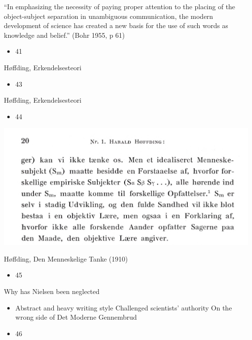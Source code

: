 \documentclass{beamer}
\begin{document}
\begin{frame}{“In emphasizing the necessity of paying proper attention to the placing of the object-subject separation in unambiguous communication, the modern development of science has created a new basis for the use of such words as knowledge and belief.” (Bohr 1955, p 61)}
\begin{itemize}
  \item 41
\end{itemize}
\end{frame}
\begin{frame}{42}
\end{frame}
\begin{frame}{Høffding, Erkendelsesteori}
\begin{itemize}
  \item 43
\end{itemize}
\end{frame}
\begin{frame}{Høffding, Erkendelsesteori}
\begin{itemize}
  \item 44
\end{itemize}
\includegraphics[width=0.9\linewidth]{slide44_img12.jpg}
\end{frame}
\begin{frame}{Høffding, Den Menneskelige Tanke (1910)}
\begin{itemize}
  \item 45
\end{itemize}
\end{frame}
\begin{frame}{Why has Nielsen been neglected}
\begin{itemize}
  \item Abstract and heavy writing style
Challenged scientists’ authority
On the wrong side of Det Moderne Gennembrud
  \item 46
\end{itemize}
\end{frame}
\end{document}
